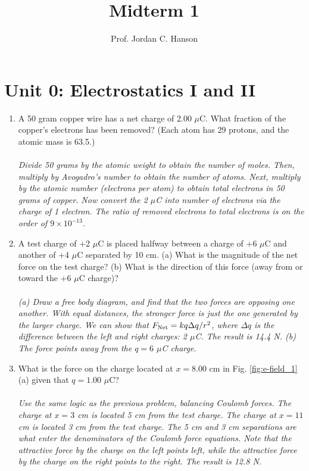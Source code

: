 \documentclass[12pt,twocolumn]{article}
\title{Midterm 1}
\author{Prof. Jordan C. Hanson}
\begin{document}
\maketitle
\small

\section{Unit 0: Electrostatics I and II}

\noindent
\begin{enumerate}
\item A 50 gram copper wire has a net charge of 2.00 $\mu$C. What fraction of the copper’s electrons has been removed? (Each atom has 29 protons, and the atomic mass is 63.5.) \\ \\
\textit{Divide 50 grams by the atomic weight to obtain the number of moles.  Then, multiply by Avogadro's number to obtain the number of atoms.  Next, multiply by the atomic number (electrons per atom) to obtain total electrons in 50 grams of copper.  Now convert the 2 $\mu$C into number of electrons via the charge of 1 electron.  The ratio of removed electrons to total electrons is on the order of $9\times 10^{-13}$.}
\item A test charge of +2 $\mu$C is placed halfway between a charge of +6 $\mu$C and another of +4 $\mu$C separated by 10 cm. (a) What is the magnitude of the net force on the test charge? (b) What is the direction of this force (away from or toward the +6 $\mu$C charge)? \\ \\
\textit{(a) Draw a free body diagram, and find that the two forces are opposing one another.  With equal distances, the stronger force is just the one generated by the larger charge.  We can show that $F_{\rm Net} = k q \Delta q/r^2$, where $\Delta q$ is the difference between the left and right charges: 2 $\mu$C.  The result is 14.4 N. (b) The force points away from the $q = 6$ $\mu$C charge.}
\item What is the force on the charge located at $x=8.00$ cm in Fig. \ref{fig:e-field_1}(a) given that $q=1.00$ $\mu$C? \\ \\
\textit{Use the same logic as the previous problem, balancing Coulomb forces.  The charge at $x=3$ cm is located 5 cm from the test charge.  The charge at $x=11$ cm is located 3 cm from the test charge.  The 5 cm and 3 cm separations are what enter the denominators of the Coulomb force equations.  Note that the attractive force by the charge on the left points left, while the attractive force by the charge on the right points to the right.  The result is 12.8 N.}

\end{enumerate}
\end{document}

